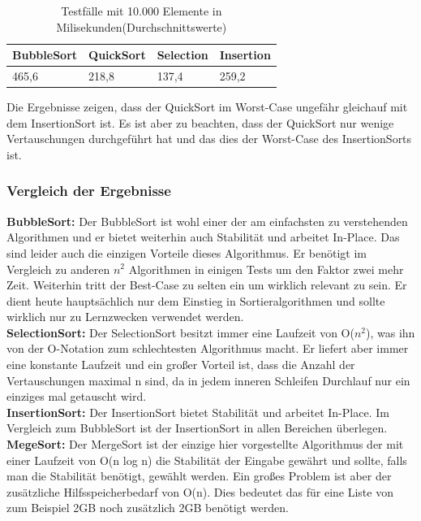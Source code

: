 \documentclass{article}
\begin{document}
\begin{table}[h]
\centering
\begin{tabular}{llll}
\hline
\textbf{BubbleSort} & \textbf{QuickSort} & \textbf{Selection} & \textbf{Insertion} \\
\hline
 465,6 & 218,8 & 137,4 & 259,2 \\
\hline
\end{tabular}
\caption{Testfälle mit 10.000 Elemente in Milisekunden(Durchschnittswerte) }
\label{tab:WC_QS}
\end{table}

Die Ergebnisse zeigen, dass der QuickSort im Worst-Case ungefähr gleichauf mit dem InsertionSort ist. Es ist aber zu beachten, dass der QuickSort nur wenige Vertauschungen durchgeführt hat und das dies der Worst-Case des InsertionSorts ist.


\subsubsection{Vergleich der Ergebnisse}

\textbf{BubbleSort:} Der BubbleSort ist wohl einer der am einfachsten zu verstehenden Algorithmen und er bietet weiterhin auch Stabilität und arbeitet In-Place. Das sind leider auch die einzigen Vorteile dieses Algorithmus. Er benötigt im Vergleich zu anderen  $n^{2}$ Algorithmen in einigen Tests um den Faktor zwei mehr Zeit. Weiterhin tritt der Best-Case zu selten ein um wirklich relevant zu sein. Er dient heute hauptsächlich nur dem Einstieg in Sortieralgorithmen und sollte wirklich nur zu Lernzwecken verwendet werden.\\

\textbf{SelectionSort:} Der SelectionSort besitzt immer eine Laufzeit von O($n^{2}$), was ihn von der O-Notation zum schlechtesten Algorithmus macht. Er liefert aber immer eine konstante Laufzeit und ein großer Vorteil ist, dass die Anzahl der Vertauschungen maximal n sind, da in jedem inneren Schleifen Durchlauf nur ein einziges mal getauscht wird. \\

\textbf{InsertionSort:} Der InsertionSort bietet Stabilität und arbeitet In-Place. Im Vergleich zum BubbleSort ist der InsertionSort in allen Bereichen überlegen.\\

\textbf{MegeSort:} Der MergeSort ist der einzige hier vorgestellte Algorithmus der mit einer Laufzeit von O(n log n) die Stabilität der Eingabe gewährt und sollte, falls man die Stabilität benötigt, gewählt werden.  Ein großes Problem ist aber der zusätzliche Hilfsspeicherbedarf von O(n). Dies bedeutet das für eine Liste von zum Beispiel 2GB noch zusätzlich 2GB benötigt werden.\\
\end{document}

